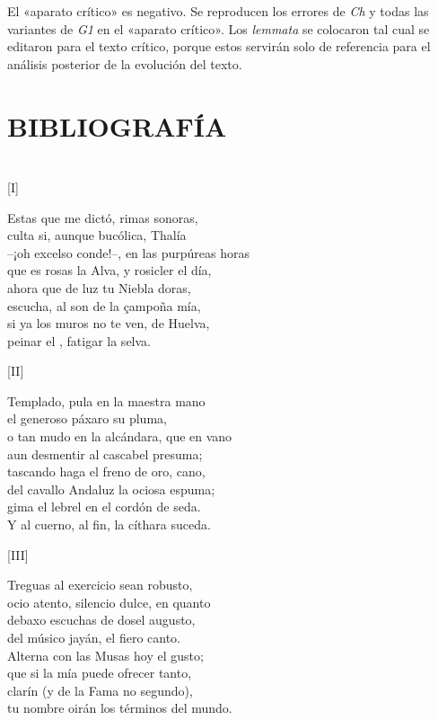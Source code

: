 \documentclass[11pt,a4paper,twoside]{article}
\newcommand{\comillas}[1]{«#1»}
\begin{document}
El \comillas{aparato crítico} es negativo. Se reproducen los errores de \textit{Ch} y todas las variantes de \textit{G1} en el \comillas{aparato crítico}. Los \textit{lemmata} se colocaron tal cual se editaron para el texto crítico, porque estos servirán solo de referencia para el análisis posterior de la evolución del texto. 

\section*{\fontsize{13}{14.35}\selectfont BIBLIOGRAFÍA}
\nocite{*}
\printbibliography[heading=none]
\newpage

\section*{\centering \fontsize{11}{14.35}\selectfont[DEDICATORIA]}
\vspace{-1em}
\begin{center}
	[I]
\end{center}
\beginnumbering
\pstart
Estas que me dictó, rimas sonoras,\\
culta si, aunque bucólica, Thalía\\
--¡oh excelso conde!--, en las purpúreas horas\\
que es rosas la Alva, y rosicler el día,\\
ahora que de luz tu Niebla doras,\\
escucha, al son de la çampoña mía,\\
si ya los muros no te ven, de Huelva,\\
peinar el , fatigar la selva.\pend
\begin{center}
	[II]
\end{center}
\pstart
Templado, pula en la maestra mano\\
el generoso páxaro su pluma,\\
o tan mudo en la alcándara, que en vano\\
aun desmentir al cascabel presuma;\\
tascando haga el freno de oro, cano,\\
del cavallo Andaluz la ociosa espuma;\\
gima el lebrel en el cordón de seda.\\
Y al cuerno, al fin, la cíthara suceda.\pend
\begin{center}
	[III]
\end{center}
\pstart
Treguas al exercicio sean robusto,\\
ocio atento, silencio dulce, en quanto\\
debaxo escuchas de dosel augusto,\\
del músico jayán, el fiero canto.\\
Alterna con las Musas hoy el gusto;\\
que si la mía puede ofrecer tanto,\\
clarín (y de la Fama no segundo),\\
tu nombre oirán los términos del mundo.\pend
\end{document}
